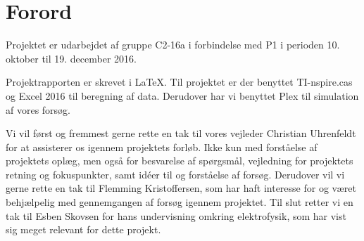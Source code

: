 \chapter{Forord}
Projektet er udarbejdet af gruppe C2-16a i forbindelse med P1 i perioden 10. oktober til 19. december 2016.

Projektrapporten er skrevet i \LaTeX. Til projektet er der benyttet TI-nspire.cas og Excel 2016 til beregning af data. Derudover har vi benyttet Plex til simulation af vores forsøg.

Vi vil først og fremmest gerne rette en tak til vores vejleder Christian Uhrenfeldt for at assisterer os igennem projektets forløb. Ikke kun med forståelse af projektets oplæg, men også for besvarelse af spørgsmål, vejledning for projektets retning og fokuspunkter, samt idéer til og forståelse af forsøg. Derudover vil vi gerne rette en tak til Flemming Kristoffersen, som har haft interesse for og været behjælpelig med gennemgangen af forsøg igennem projektet. Til slut retter vi en tak til Esben Skovsen for hans undervisning omkring elektrofysik, som har vist sig meget relevant for dette projekt.
